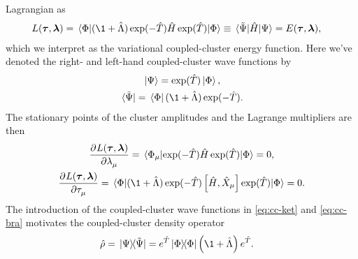             Lagrangian as
            \begin{align}
                L(\vfg{\clustamp}, \vfg{\clustlamp})
                &= \mel*{\slat}{
                    (\1 + \clustl)
                    \exponential(-\clust)
                    \hamil
                    \exponential(\clust)
                }{\slat}
                \equiv \mel*{\tilde{\Psi}}{\hamil}{\Psi}
                = E(\vfg{\clustamp}, \vfg{\clustlamp}),
                \label{eq:cc-energy-functional}
            \end{align}
            which we interpret as the variational coupled-cluster energy
            function.
            Here we've denoted the right- and left-hand coupled-cluster wave
            functions by
            \begin{gather}
                \ket*{\Psi} = \exponential(\clust)\ket*{\slat},
                \label{eq:cc-ket}
                \\
                \bra*{\tilde{\Psi}} = \bra*{\slat}(\1 + \clustl)
                \exponential(-\clust).
                \label{eq:cc-bra}
            \end{gather}
            The stationary points of the cluster amplitudes and the Lagrange
            multipliers are then
            \begin{gather}
                \dpd[]{L(\vfg{\clustamp}, \vfg{\clustlamp})}
                {\clustlamp_{\mu}}
                = \mel*{\slat_{\mu}}{
                    \exponential(-\clust)
                    \hamil
                    \exponential(\clust)
                }{\slat}
                = 0,
                \label{eq:cc-lagrangian-tau}
                \\
                \dpd[]{L(\vfg{\clustamp}, \vfg{\clustlamp})}
                {\clustamp_{\mu}}
                = \mel*{\slat}{
                    (\1 + \clustl)
                    \exponential(-\clust)
                    \com{\hamil}{\hat{X}_{\mu}}
                    \exponential(\clust)
                }{\slat}
                \label{eq:cc-lagrangian-lambda}
                = 0.
            \end{gather}
            The introduction of the coupled-cluster wave functions in
            \autoref{eq:cc-ket} and \autoref{eq:cc-bra} motivates the
            coupled-cluster density operator \cite{kvaal2013variational}
            \begin{align}
                \density
                &= \dyad*{\Psi}{\tilde{\Psi}}
                = e^{\clust}\dyad{\slat}{\slat}\para{\1 + \clustl}e^{\clust}.
                \label{eq:cc-density-operator}
            \end{align}
